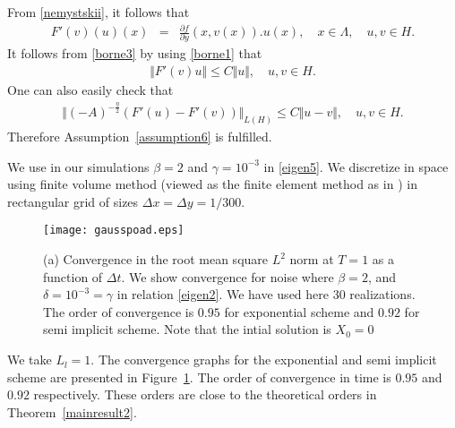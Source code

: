 \documentclass[review,12pt]{elsarticle}
\newcommand{\figref}[1]{{Figure~\ref{#1}}}
\newcommand{\Dt}{\Delta t}
\newcommand{\thmref}[1]{{Theorem~\ref{#1}}}
\newcommand{\assref}[1]{{Assumption~\ref{#1}}}
\begin{document}
 From \eqref{nemystskii}, it follows that
 \begin{eqnarray}
 \label{borne3}
 F'(v)(u)(x)&=&\frac{\partial f}{\partial y}(x, v(x)).u(x),\quad x\in\Lambda,\quad u,v\in H.
 \end{eqnarray}
 It follows from \eqref{borne3} by using \eqref{borne1} that
\begin{eqnarray}
\label{borne5}
\Vert F'(v)u\Vert\leq C\Vert u\Vert,\quad u, v\in H.
\end{eqnarray}
One can also easily check that 
\begin{eqnarray*}
\Vert (-A)^{-\frac{\eta}{2}}\left(F'(u)-F'(v)\right)\Vert_{L(H)}\leq C\Vert u-v\Vert,\quad u,v\in H.
\end{eqnarray*}
 Therefore \assref{assumption6} is fulfilled.

 
   We use in our simulations $\beta=2$ and $\gamma=10^{-3}$ in \eqref{eigen5}.
 We discretize in space using finite volume method (viewed as the finite element method as in \cite{Antonio1}) in rectangular grid of sizes $\Delta x=\Delta y= 1/300$. 
\begin{figure}[!ht]
 \begin{center}
    \label{FIGI}
    \texttt{[image: gausspoad.eps]}
  \caption{(a) Convergence in the root mean square $L^{2}$ norm at $T=1$ as a
    function of $\Dt$. We show convergence for noise  where 
    $\beta=2$, and  $\delta=10^{-3}=\gamma$ in relation \eqref{eigen2}. We have  used here 30 realizations.  The order of convergence is $0.95$ for exponential scheme and $0.92$ for semi implicit scheme. 
    Note that the intial solution is $X_0=0$
    } 
  \label{FIGI} 
  \end{center}
  \end{figure}
   We take $L_l=1$. The convergence graphs for the exponential and semi implicit scheme are presented in  \figref{FIGI}. The order of convergence in time is $0.95$ and $0.92$ respectively.  
  These orders are close to the theoretical  orders in \thmref{mainresult2}.
\end{document}

